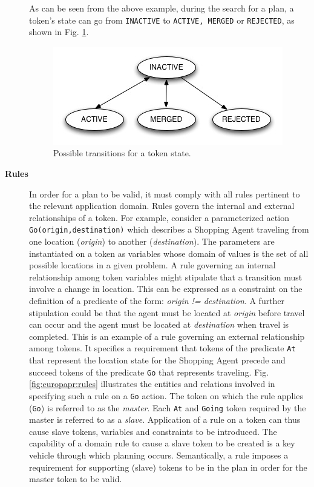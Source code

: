 \begin{description}
As can be seen from the above example, during the search for a plan, a
token's state can go from \texttt{INACTIVE} to \texttt{ACTIVE, MERGED}
or \texttt{REJECTED}, as shown in Fig. \ref{fig:europapr:states}.

\begin{figure} \centering
  \includegraphics[scale=0.45]{figs/europa-pr-states.jpg}
  \caption{\small Possible transitions for a token state.}
\label{fig:europapr:states}
\end{figure}


\item[\textbf{Rules}] In order for a plan to be valid, it must comply
  with all rules pertinent to the relevant application domain. Rules
  govern the internal and external relationships of a token. For
  example, consider a parameterized action
  \texttt{Go(origin,destination)} which describes a Shopping Agent
  traveling from one location (\textit{origin}) to another
  (\textit{destination}). The parameters are instantiated on a token
  as variables whose domain of values is the set of all possible
  locations in a given problem. A rule governing an internal
  relationship among token variables might stipulate that a transition
  must involve a change in location. This can be expressed as a
  constraint on the definition of a predicate of the form:
  \textit{origin != destination}. A further stipulation could be that
  the agent must be located at \textit{origin} before travel can occur
  and the agent must be located at \textit{destination} when travel is
  completed. This is an example of a rule governing an external
  relationship among tokens. It specifies a requirement that tokens of
  the predicate \texttt{At} that represent the location state for the
  Shopping Agent precede and succeed tokens of the predicate
  \texttt{Go} that represents traveling. Fig. \ref{fig:europapr:rules}
  illustrates the entities and relations involved in specifying such a
  rule on a \texttt{Go} action. The token on which the rule applies
  (\texttt{Go}) is referred to as the \emph{master}. Each \texttt{At}
  and \texttt{Going} token required by the master is referred to as a
  \emph{slave}.  Application of a rule on a token can thus cause slave
  tokens, variables and constraints to be introduced.  The capability
  of a domain rule to cause a slave token to be created is a key
  vehicle through which planning occurs. Semantically, a rule imposes
  a requirement for supporting (slave) tokens to be in the plan in
  order for the master token to be valid.


\end{description}
